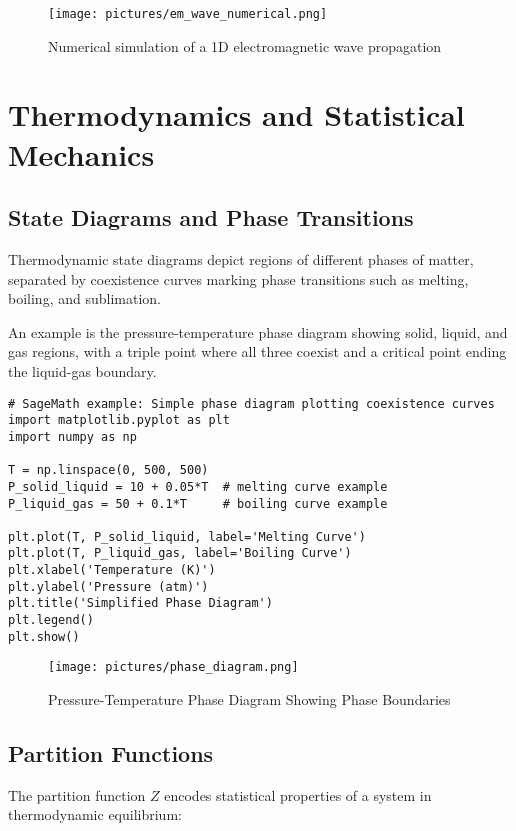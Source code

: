 \documentclass[12pt]{book}
\begin{document}
\begin{figure}[H]
  \centering
  \texttt{[image: pictures/em\_wave\_numerical.png]}
  \caption{Numerical simulation of a 1D electromagnetic wave propagation}
  \label{fig:em_wave_numerical}
\end{figure}

\chapter{Thermodynamics and Statistical Mechanics}

\section{State Diagrams and Phase Transitions}

Thermodynamic state diagrams depict regions of different phases of matter, separated by coexistence curves marking phase transitions such as melting, boiling, and sublimation.

An example is the pressure-temperature phase diagram showing solid, liquid, and gas regions, with a triple point where all three coexist and a critical point ending the liquid-gas boundary.

\begin{verbatim}
# SageMath example: Simple phase diagram plotting coexistence curves
import matplotlib.pyplot as plt
import numpy as np

T = np.linspace(0, 500, 500)
P_solid_liquid = 10 + 0.05*T  # melting curve example
P_liquid_gas = 50 + 0.1*T     # boiling curve example

plt.plot(T, P_solid_liquid, label='Melting Curve')
plt.plot(T, P_liquid_gas, label='Boiling Curve')
plt.xlabel('Temperature (K)')
plt.ylabel('Pressure (atm)')
plt.title('Simplified Phase Diagram')
plt.legend()
plt.show()
\end{verbatim}

\begin{figure}[H]
  \centering
  \texttt{[image: pictures/phase\_diagram.png]}
  \caption{Pressure-Temperature Phase Diagram Showing Phase Boundaries}
  \label{fig:phase_diagram}
\end{figure}

\section{Partition Functions}

The partition function \(Z\) encodes statistical properties of a system in thermodynamic equilibrium:
\end{document}
